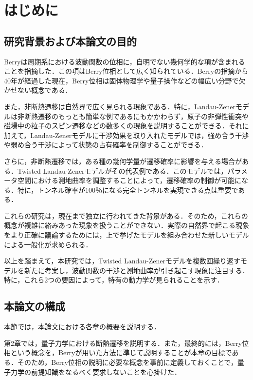 \chapter{はじめに}

\section{研究背景および本論文の目的}

Berryは周期系における波動関数の位相に，自明でない幾何学的な項が含まれることを指摘した\cite{Berry1984}．この項はBerry位相として広く知られている．Berryの指摘から40年が経過した現在，Berry位相は固体物理学や量子操作などの幅広い分野で欠かせない概念である．


また，非断熱遷移は自然界で広く見られる現象である．特に，Landau-Zenerモデルは非断熱遷移のもっとも簡単な例であるにもかかわらず，原子の非弾性衝突や磁場中の粒子のスピン遷移などの数多くの現象を説明することができる\cite{Zener}．それに加えて，Landau-Zenerモデルに干渉効果を取り入れたモデルでは，強め合う干渉や弱め合う干渉によって状態の占有確率を制御することができる\cite{Kayanuma1993}．


さらに，非断熱遷移では，ある種の幾何学量が遷移確率に影響を与える場合がある\cite{Berry1990}．Twisted Landau-Zenerモデルがその代表例である．このモデルでは，パラメータ空間における測地曲率を調整することによって，遷移確率の制御が可能になる\cite{Oka}．特に，トンネル確率が100％になる完全トンネルを実現できる点は重要である．


これらの研究は，現在まで独立に行われてきた背景がある．そのため，これらの概念が複雑に絡みあった現象を扱うことができない．実際の自然界で起こる現象をより正確に議論するためには，上で挙げたモデルを組み合わせた新しいモデルによる一般化が求められる．


以上を踏まえて，本研究では，Twisted Landau-Zenerモデルを複数回繰り返すモデルを新たに考案し，波動関数の干渉と測地曲率が引き起こす現象に注目する．特に，これら2つの要因によって，特有の動力学が見られることを示す．

\section{本論文の構成}
本節では，本論文における各章の概要を説明する．


第2章では，量子力学における断熱遷移を説明する．また，最終的には，Berry位相という概念を，Berryが用いた方法に準じて説明することが本章の目標である．そのため，Berry位相の説明に必要な概念を事前に定義しておくことで，量子力学の前提知識をなるべく要求しないことを心掛けた．


